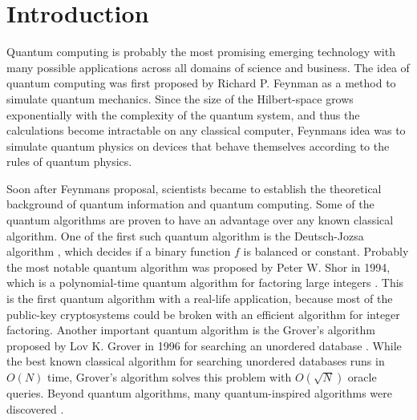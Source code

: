\documentclass[12pt, a4paper,  nobibnotes]{article}
\begin{document}
\section{Introduction}
Quantum computing is probably the most promising emerging technology with many possible applications across
all domains of science and business. The idea of quantum computing was first proposed by Richard P. Feynman
as a method to simulate quantum mechanics. Since the size of the Hilbert-space grows exponentially with
the complexity of the quantum system, and thus the calculations become intractable on any classical
computer, Feynmans idea was to simulate quantum physics on devices that behave themselves according to 
the rules of quantum physics.
\par
Soon after Feynmans proposal, scientists became to establish the theoretical background of quantum
information and quantum computing. Some of the quantum algorithms are proven to have an 
advantage over any known classical algorithm. One of the first such quantum algorithm is 
the Deutsch-Jozsa algorithm \cite{DeutschJozsa1992}, which decides if a binary function $f$ 
is balanced or constant. Probably the most notable quantum algorithm was proposed by Peter W. Shor 
in 1994, which is a polynomial-time quantum algorithm for factoring large integers \cite{Shor1994}.
This is the first quantum algorithm with a real-life application, because most of the public-key
cryptosystems could be broken with an efficient algorithm for integer factoring. 
Another important quantum algorithm is the Grover's algorithm proposed by Lov K. Grover in 1996 for
searching an unordered database \cite{Grover1996}. While the best known classical algorithm 
for searching unordered databases runs in $O(N)$ time, Grover's algorithm solves this problem
with $O(\sqrt N)$ oracle queries. Beyond quantum algorithms, many quantum-inspired algorithms were 
discovered \cite{Tang2019,Ding2019QuantumInspiredSVM,ArrazolaQuantumInspired2019}.
\end{document}
